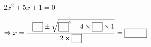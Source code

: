 $2x^2+5x+1=0$\par\noindent $\Rightarrow x=\dfrac{-\blank\pm\sqrt{\blank^2-4\times\blank\times1}}{2\times\blank}=\blank[3.2em]$
